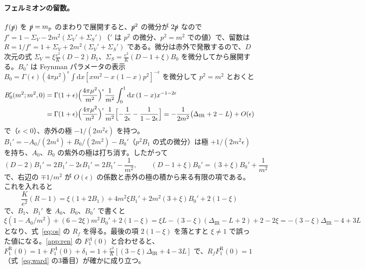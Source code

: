 \documentclass[a4paper,10pt]{ltjsarticle}
\newcommand{\dd}{\mathrm{d}}
\newcommand{\DIR}{\Delta_{\mathrm{IR}}}
\begin{document}
\paragraph{フェルミオンの留数。}$f(\slashed p)$ を $\slashed p=m_{\mathrm p}$ のまわりで展開すると、$\slashed p^2$ の微分が $2\slashed p$ なので $f'=1-\Sigma_V-2m^2(\Sigma_V'+\Sigma_S')$（$'$ は $p^2$ の微分、$p^2=m^2$ での値）で、留数は $R=1/f'=1+\Sigma_V+2m^2(\Sigma_V'+\Sigma_S')$ である。微分は赤外で発散するので、$D$ 次元の式 $\Sigma_V=\xi\frac{e^2}{K}(D-2)B_1$、$\Sigma_S=\frac{e^2}{K}(D-1+\xi)B_0$ を微分してから展開する。$B_0'$ は Feynman パラメータの表示 $B_0=\Gamma(\epsilon)(4\pi\mu^2)^\epsilon\int\dd x[xm^2-x(1-x)p^2]^{-\epsilon}$ を微分して $p^2=m^2$ とおくと
\begin{equation*}
\begin{aligned}
B_0'(m^2;m^2,0)&=\Gamma(1+\epsilon)\Bigl(\frac{4\pi\mu^2}{m^2}\Bigr)^\epsilon\frac{1}{m^2}\int_0^1\dd x\,(1-x)x^{-1-2\epsilon}\\
&=\Gamma(1+\epsilon)\Bigl(\frac{4\pi\mu^2}{m^2}\Bigr)^\epsilon\frac{1}{m^2}\Bigl[-\frac{1}{2\epsilon}-\frac{1}{1-2\epsilon}\Bigr]=-\frac{1}{2m^2}\bigl(\DIR+2-L\bigr)+O(\epsilon)
\end{aligned}
\end{equation*}
で（$\epsilon<0$）、赤外の極 $-1/(2m^2\epsilon)$ を持つ。$B_1'=-A_0/(2m^4)+B_0/(2m^2)-B_0'$（$p^2B_1$ の式の微分）は極 $+1/(2m^2\epsilon)$ を持ち、$A_0$、$B_0$ の紫外の極は打ち消す。したがって
\begin{equation*}
(D-2)B_1'=2B_1'-2\epsilon B_1'=2B_1'-\frac{1}{m^2},\qquad
(D-1+\xi)B_0'=(3+\xi)B_0'+\frac{1}{m^2}
\end{equation*}
で、右辺の $\mp1/m^2$ が $O(\epsilon)$ の係数と赤外の極の積から来る有限の項である。これを入れると
\begin{equation*}
\frac{K}{e^2}(R-1)=\xi(1+2B_1)+4m^2\xi B_1'+2m^2(3+\xi)B_0'+2(1-\xi)
\end{equation*}
で、$B_1$、$B_1'$ を $A_0$、$B_0$、$B_0'$ で書くと $\xi(1-A_0/m^2)+(6-2\xi)m^2B_0'+2(1-\xi)=\xi L-(3-\xi)(\DIR-L+2)+2-2\xi=-(3-\xi)\DIR-4+3L$ となり、式~\eqref{eq:os} の $R_f$ を得る。最後の項 $2(1-\xi)$ を落とすと $\xi\ne1$ で誤った値になる。\ref{app:ren} の $F_1^\Lambda(0)$ と合わせると、$F_1^{\mathrm R}(0)=1+F_1^\Lambda(0)+\delta_1=1+\frac{e^2}{K}[(3-\xi)\DIR+4-3L]$ で、$R_fF_1^{\mathrm R}(0)=1$（式~\eqref{eq:ward} の3番目）が確かに成り立つ。
\end{document}
